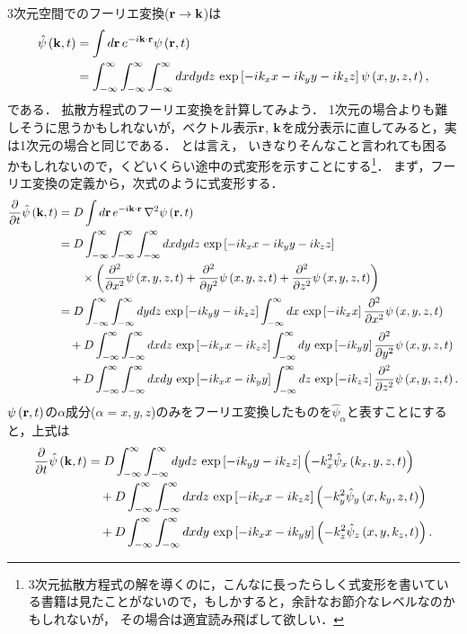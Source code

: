 3次元空間でのフーリエ変換(${\bf r}\to {\bf k}$)は
\begin{align}
\hat{\psi}\left({\bf k},t\right) & =\int d{\bf r}\,e^{-i{\bf k}\cdot{\bf r}}\psi\left({\bf r},t\right)\notag\\
 & =\int_{-\infty}^{\infty}\int_{-\infty}^{\infty}\int_{-\infty}^{\infty}dxdydz\,\exp\left[-ik_{x}x-ik_{y}y-ik_{z}z\right]\psi\left(x,y,z,t\right),
\end{align}
である．
拡散方程式のフーリエ変換を計算してみよう．
1次元の場合よりも難しそうに思うかもしれないが，ベクトル表示${\bf r}$, ${\bf k}$を成分表示に直してみると，実は1次元の場合と同じである．
とは言え，
いきなりそんなこと言われても困るかもしれないので，くどいくらい途中の式変形を示すことにする\footnote{3次元拡散方程式の解を導くのに，こんなに長ったらしく式変形を書いている書籍は見たことがないので，もしかすると，余計なお節介なレベルなのかもしれないが，
その場合は適宜読み飛ばして欲しい．}．
まず，フーリエ変換の定義から，次式のように式変形する．
\begin{align}
\dfrac{\partial}{\partial t}\hat{\psi}\left({\bf k},t\right) & =D\int d{\bf r}\,e^{-i{\bf k}\cdot{\bf r}}\,\nabla^{2}\psi\left({\bf r},t\right)\notag\\
 & =D\int_{-\infty}^{\infty}\int_{-\infty}^{\infty}\int_{-\infty}^{\infty}dxdydz\,\exp\left[-ik_{x}x-ik_{y}y-ik_{z}z\right]\notag\\
 & \qquad\times\left(\dfrac{\partial^{2}}{\partial x^{2}}\psi\left(x,y,z,t\right)+\dfrac{\partial^{2}}{\partial y^{2}}\psi\left(x,y,z,t\right)+\dfrac{\partial^{2}}{\partial z^{2}}\psi\left(x,y,z,t\right)\right)\notag\\
 & =D\int_{-\infty}^{\infty}\int_{-\infty}^{\infty}dydz\,\exp\left[-ik_{y}y-ik_{z}z\right]\int_{-\infty}^{\infty}dx\,\exp\left[-ik_{x}x\right]\dfrac{\partial^{2}}{\partial x^{2}}\psi\left(x,y,z,t\right)\notag\\
 & \quad+D\int_{-\infty}^{\infty}\int_{-\infty}^{\infty}dxdz\,\exp\left[-ik_{x}x-ik_{z}z\right]\int_{-\infty}^{\infty}dy\,\exp\left[-ik_{y}y\right]\dfrac{\partial^{2}}{\partial y^{2}}\psi\left(x,y,z,t\right)\notag\\
 & \quad+D\int_{-\infty}^{\infty}\int_{-\infty}^{\infty}dxdy\,\exp\left[-ik_{x}x-ik_{y}y\right]\int_{-\infty}^{\infty}dz\,\exp\left[-ik_{z}z\right]\dfrac{\partial^{2}}{\partial z^{2}}\psi\left(x,y,z,t\right).
\end{align}
$\psi\left({\bf r},t\right)$の$\alpha$成分($\alpha=x,y,z$)のみをフーリエ変換したものを$\hat{\psi}_{\alpha}$と表すことにすると，上式は
\begin{align}
 \dfrac{\partial}{\partial t}\hat{\psi}\left({\bf k},t\right) & =D\int_{-\infty}^{\infty}\int_{-\infty}^{\infty}dydz\,\exp\left[-ik_{y}y-ik_{z}z\right]\left(-k_{x}^{2}\hat{\psi}_{x}\left(k_{x},y,z,t\right)\right)\notag\\
 & \quad+D\int_{-\infty}^{\infty}\int_{-\infty}^{\infty}dxdz\,\exp\left[-ik_{x}x-ik_{z}z\right]\left(-k_{y}^{2}\hat{\psi}_{y}\left(x,k_{y},z,t\right)\right)\notag\\
 & \quad+D\int_{-\infty}^{\infty}\int_{-\infty}^{\infty}dxdy\,\exp\left[-ik_{x}x-ik_{y}y\right]\left(-k_{z}^{2}\hat{\psi}_{z}\left(x,y,k_{z},t\right)\right).
\end{align}
